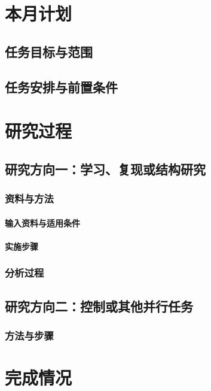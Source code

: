 \documentclass[stage2]{ydzjreport}
\begin{document}
\makestagetwohead

\section{本月计划}
\subsection{任务目标与范围}
\subsection{任务安排与前置条件}

\section{研究过程}
\subsection{研究方向一：学习、复现或结构研究}
\subsubsection{资料与方法}
\paragraph{输入资料与适用条件}
\paragraph{实施步骤}
\subsubsection{分析过程}
\subsection{研究方向二：控制或其他并行任务}
\subsubsection{方法与步骤}

\section{完成情况}
\end{document}
